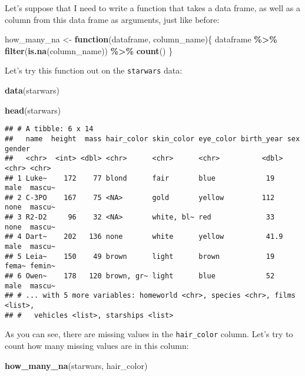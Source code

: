 \documentclass[
]{article}
\newenvironment{Shaded}{\begin{snugshade}}{\end{snugshade}}
\newcommand{\ControlFlowTok}[1]{\textcolor[rgb]{0.13,0.29,0.53}{\textbf{#1}}}
\newcommand{\KeywordTok}[1]{\textcolor[rgb]{0.13,0.29,0.53}{\textbf{#1}}}
\newcommand{\NormalTok}[1]{#1}
\newcommand{\OperatorTok}[1]{\textcolor[rgb]{0.81,0.36,0.00}{\textbf{#1}}}
\newcommand{\StringTok}[1]{\textcolor[rgb]{0.31,0.60,0.02}{#1}}
\begin{document}
Let's suppose that I need to write a function that takes a data frame, as well as a column from
this data frame as arguments, just like before:

\begin{Shaded}
\begin{Highlighting}[]
\NormalTok{how\_many\_na \textless{}{-}}\StringTok{ }\ControlFlowTok{function}\NormalTok{(dataframe, column\_name)\{}
\NormalTok{  dataframe }\OperatorTok{\%\textgreater{}\%}
\StringTok{    }\KeywordTok{filter}\NormalTok{(}\KeywordTok{is.na}\NormalTok{(column\_name)) }\OperatorTok{\%\textgreater{}\%}
\StringTok{    }\KeywordTok{count}\NormalTok{()}
\NormalTok{\}}
\end{Highlighting}
\end{Shaded}

Let's try this function out on the \texttt{starwars} data:

\begin{Shaded}
\begin{Highlighting}[]
\KeywordTok{data}\NormalTok{(starwars)}

\KeywordTok{head}\NormalTok{(starwars)}
\end{Highlighting}
\end{Shaded}

\begin{verbatim}
## # A tibble: 6 x 14
##   name  height  mass hair_color skin_color eye_color birth_year sex   gender
##   <chr>  <int> <dbl> <chr>      <chr>      <chr>          <dbl> <chr> <chr> 
## 1 Luke~    172    77 blond      fair       blue            19   male  mascu~
## 2 C-3PO    167    75 <NA>       gold       yellow         112   none  mascu~
## 3 R2-D2     96    32 <NA>       white, bl~ red             33   none  mascu~
## 4 Dart~    202   136 none       white      yellow          41.9 male  mascu~
## 5 Leia~    150    49 brown      light      brown           19   fema~ femin~
## 6 Owen~    178   120 brown, gr~ light      blue            52   male  mascu~
## # ... with 5 more variables: homeworld <chr>, species <chr>, films <list>,
## #   vehicles <list>, starships <list>
\end{verbatim}

As you can see, there are missing values in the \texttt{hair\_color} column. Let's try to count how many
missing values are in this column:

\begin{Shaded}
\begin{Highlighting}[]
\KeywordTok{how\_many\_na}\NormalTok{(starwars, hair\_color)}
\end{Highlighting}
\end{Shaded}
\end{document}
